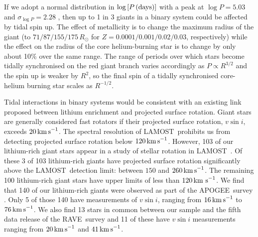 \documentclass[twocolumn]{aastex62}
\newcommand{\todo}[1]{\textcolor{red}{#1}} %
\newcommand\lamost{LAMOST}
\newcommand\apogee{APOGEE}
\newcommand\rave{RAVE}
\begin{document}
If we adopt a normal distribution in $\log{[P\,{\rm (days)}]}$ with a peak at $\log{P} = 5.03$ and $\sigma_{\log{P}} = 2.28$ \citep[as inferred from observations;][]{Raghavan_2010}, then up to 1 in 3 giants in a binary system could be affected by tidal spin up.
The effect of metallicity
is to change the maximum radius of the giant (to $71/87/155/175\,R_\odot$ for $Z = 0.0001/0.001/0.02/0.03$, respectively) 
while the effect on the 
radius of the core helium-burning star is to change by only about 10\% over the same
range. The range of periods over which stars become tidally synchronised on the red giant
branch varies accordingly as $P \propto R^{3/2}$ and the spin up is weaker by $R^2$, so the
final spin of a tidally synchronised core-helium burning star scales as $R^{-1/2}$.







Tidal interactions in binary systems would be consistent with an existing link proposed
between lithium enrichment and projected surface rotation. Giant 
stars are generally considered fast rotators if their projected surface rotation, 
$v\sin{i}$, exceeds $20\,{\rm km\,s}^{-1}$. The spectral resolution of \lamost\
prohibits us from detecting projected surface rotation below $120\,{\rm km\,s}^{-1}$.  
However, 103 of our lithium-rich giant stars appear in a study of stellar
rotation in \lamost\ \citep{Frasca_2016}. Of these 3 of 103 lithium-rich giants have
projected surface rotation significantly above the \lamost\ detection limit: between
$150$ and $260\,{\rm km\,s}^{-1}$. 
The remaining 100 lithium-rich giant stars have upper limits of less than $120\,{\rm km~s}^{-1}$.
We find that 140
of our lithium-rich giants were observed as part of the \apogee\ survey \citep{Abolfathi_2018}.
Only 5 of those 140 have measurements of $v\sin{i}$, ranging from $16\,{\rm km\,s}^{-1}$ to
$76\,{\rm km\,s}^{-1}$.  We also find 13 stars in common between our sample and
the fifth data release of the \rave\ survey \citep{Kunder_2017} and 11 of these 
have $v\sin{i}$ measurements ranging from $20\,{\rm km\,s}^{-1}$ and $41\,{\rm km\,s}^{-1}$. 
\end{document}
